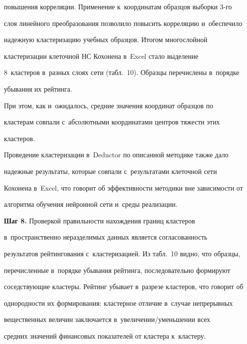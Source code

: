 \begin{description}
повышения корреляции. Применение к~координатам образцов выборки 3-го 


слоя линейного преобразования позволило повысить корреляцию и~обеспечило 


надежную клас\-те\-ри\-за\-цию учебных образцов. Итогом многослойной 


клас\-те\-ри\-за\-ции клеточной НС Кохонена в~Excel стало выделение 


8~клас\-те\-ров в~разных слоях сети (табл.~10). Образцы перечислены в~порядке 


убывания их рейтинга. 


    При этом, как и~ожидалось, средние значения координат образцов по 


кластерам совпали с~абсолютными координатами центров тяжести этих 


кластеров.


  


  Проведение кластеризации в~Deductor по описанной методике также дало 


надежные результаты, которые совпали с~результатами клеточной сети 


Кохонена в~Excel, что говорит об эффективности методики вне зависимости от 


алгоритма обучения нейронной сети и~среды реализации.


  


  


\item[\,]  \textbf{Шаг 8.} Проверкой правильности нахождения границ кластеров 


в~пространственно неразделимых данных является согласованность 


результатов рейтингования с~кластеризацией. Из табл.~10 видно, что образцы, 


перечисленные в~порядке убывания рейтинга, последовательно формируют 


соседствующие клас\-те\-ры. Рейтинг убывает в~разрезе кластеров, что говорит об 


однородности их формирования: кластерное отличие в~случае непрерывных 


вещественных величин заключается в~уве\-ли\-че\-нии\!/\!умень\-ше\-нии всех 


средних значений финансовых показателей от кластера к~кластеру.


\end{description}


